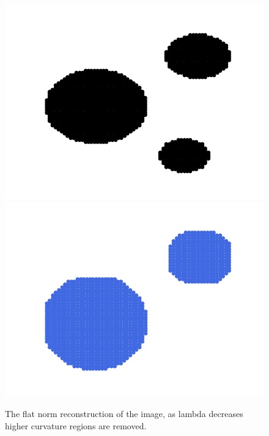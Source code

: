 \documentclass[12pt]{article}
\begin{document}
\begin{figure}[H]
	\centering
	\includegraphics[scale=0.4]{figures/circlesgraph.png}
	\includegraphics[scale=0.4]{figures/circlesdisappear.png}
	\caption{The flat norm reconstruction of the image, as lambda decreases higher curvature regions are removed.}
\end{figure}
\end{document}
